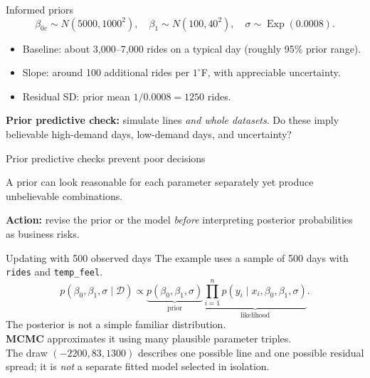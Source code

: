 \documentclass[aspectratio=43,11pt]{beamer}
\newcommand{\dd}{\mathcal D}
\begin{document}
\begin{frame}{Informed priors}
\[\beta_{0c}\sim N(5000,1000^2),\quad \beta_1\sim N(100,40^2),\quad \sigma\sim\operatorname{Exp}(0.0008).\]

\begin{itemize}
\item Baseline: about 3,000--7,000 rides on a typical day (roughly 95\% prior range).
\item Slope: around 100 additional rides per $1^\circ$F, with appreciable uncertainty.
\item Residual SD: prior mean $1/0.0008=1250$ rides.
\end{itemize}

\par\medskip
\textbf{Prior predictive check:} simulate lines \emph{and whole datasets}. Do these imply believable high-demand days, low-demand days, and uncertainty?
\end{frame}

\begin{frame}{Prior predictive checks prevent poor decisions}
\begin{center}\end{center}
A prior can look reasonable for each parameter separately yet produce unbelievable combinations.
\par\medskip\textbf{Action:} revise the prior or the model \emph{before} interpreting posterior probabilities as business risks.
\end{frame}

\begin{frame}{Updating with 500 observed days}
The example uses a sample of 500 days with \texttt{rides} and \texttt{temp\_feel}.
\[p(\beta_0,\beta_1,\sigma\mid\dd)\propto
\underbrace{p(\beta_0,\beta_1,\sigma)}_{\text{prior}}
\underbrace{\prod_{i=1}^{n}p(y_i\mid x_i,\beta_0,\beta_1,\sigma)}_{\text{likelihood}}.\]
The posterior is not a simple familiar distribution.\\
\textbf{MCMC} approximates it using many plausible parameter triples.\\
The draw $(-2200,83,1300)$ describes one possible line and one possible residual spread; it is \emph{not} a separate fitted model selected in isolation.
\end{frame}
\end{document}
